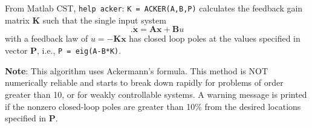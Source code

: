 From Matlab CST, \verb|help acker|:
\verb|K = ACKER(A,B,P)|  calculates the feedback gain matrix $\mathbf{K}$ such that
the single input system
\[	            .
\dot{\mathbf{x}}=\mathbf{Ax}+\mathbf{B}u
\]
with a feedback law of  $u = -\mathbf{Kx}$  has closed loop poles at the 
values specified in vector $\mathbf{P}$, i.e.,  \texttt{P = eig(A-B*K)}.

\textbf{Note}: This algorithm uses Ackermann's formula.  This method
is NOT numerically reliable and starts to break down rapidly
for problems of order greater than 10, or for weakly controllable
systems.  A warning message is printed if the nonzero closed-loop
poles are greater than 10\% from the desired locations specified 
in $\mathbf{P}$.


\endinput

